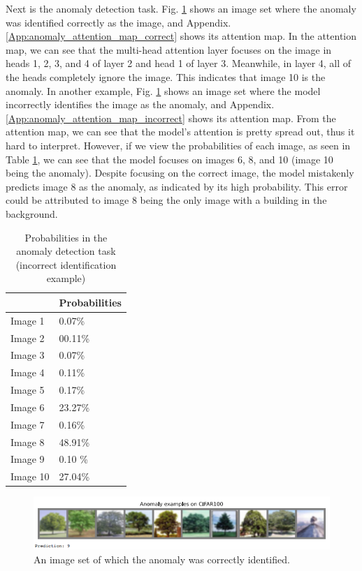 \documentclass[peerreview]{IEEEtran}
\begin{document}
Next is the anomaly detection task. Fig. \ref{anomaly_correct} shows an image set where the anomaly was identified correctly as the  image, and Appendix. \ref{App:anomaly_attention_map_correct} shows its attention map. In the attention map, we can see that the multi-head attention layer focuses on the  image in heads 1, 2, 3, and 4 of layer 2 and head 1 of layer 3. Meanwhile, in layer 4, all of the heads completely ignore the  image. This indicates that image 10 is the anomaly. In another example, Fig. \ref{anomaly_correct} shows an image set where the model incorrectly identifies the  image as the anomaly, and Appendix. \ref{App:anomaly_attention_map_incorrect} shows its attention map. From the attention map, we can see that the model's attention is pretty spread out, thus it hard to interpret. However, if we view the probabilities of each image, as seen in Table \ref{tab:probabilities}, we can see that the model focuses on images 6, 8, and 10 (image 10 being the anomaly). Despite focusing on the correct image, the model mistakenly predicts image 8 as the anomaly, as indicated by its high probability. This error could be attributed to image 8 being the only image with a building in the background.

\begin{table}[h] 
\centering 
\begin{tabular}{l l}
\toprule 
 & Probabilities\\ 
\midrule
Image 1 & 0.07\% \\ 
Image 2 & 00.11\% \\ 
Image 3 & 0.07\% \\
Image 4 & 0.11\% \\
Image 5 & 0.17\% \\
Image 6 & 23.27\% \\ 
Image 7 & 0.16\% \\
Image 8 & 48.91\% \\
Image 9 & 0.10 \% \\ 
Image 10 & 27.04\%\\
\bottomrule
\end{tabular}
\smallskip 
\caption{Probabilities in the anomaly detection task (incorrect identification example)} 
\label{tab:probabilities} 
\end{table}


\begin{figure}[!h]
\centering
\includegraphics[width=1\columnwidth]{anomaly_correct} 
\caption{An image set of which the anomaly was correctly identified.}
\label{anomaly_correct}
\end{figure}
\end{document}
